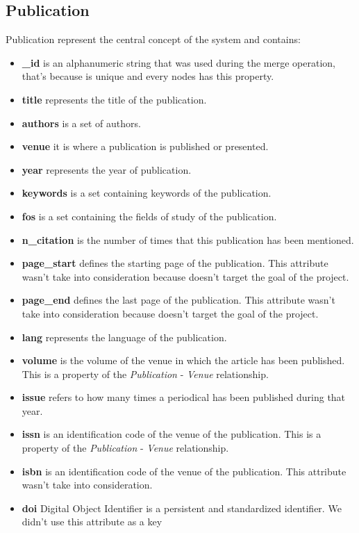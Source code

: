 \documentclass{Configuration_Files/PoliMi3i_thesis}
\begin{document}
\subsection{Publication}
Publication represent the central concept of the system and contains:
\begin{itemize}
    \item \textbf{\_id} is an alphanumeric string that was used during the merge operation, that's because is unique and
            every nodes has this property.
    \item \textbf{title} represents the title of the publication.
    \item \textbf{authors} is a set of authors.
    \item \textbf{venue} it is where a publication is published or presented.
    \item \textbf{year} represents the year of publication.
    \item \textbf{keywords} is a set containing keywords of the publication.
    \item \textbf{fos} is a set containing the fields of study of the publication.
    \item \textbf{n\_citation} is the number of times that this publication has been mentioned.
    \item \textbf{page\_start} defines the starting page of the publication. This attribute wasn't take into consideration
            because doesn't target the goal of the project.
    \item \textbf{page\_end} defines the last page of the publication. This attribute wasn't take into consideration
            because doesn't target the goal of the project.
    \item \textbf{lang} represents the language of the publication.
    \item \textbf{volume} is the volume of the venue in which the article has been published. This is a property of the \emph{Publication}
            - \emph{Venue} relationship.
    \item \textbf{issue} refers to how many times a periodical has been published during that year.
    \item \textbf{issn} is an identification code of the venue of the publication. This is a property of the \emph{Publication}
    - \emph{Venue} relationship.
    \item \textbf{isbn} is an identification code of the venue of the publication. This attribute wasn't take into consideration.
    \item \textbf{doi} Digital Object Identifier is a persistent and standardized identifier. We didn't use this attribute as a key

\end{itemize}
\end{document}
